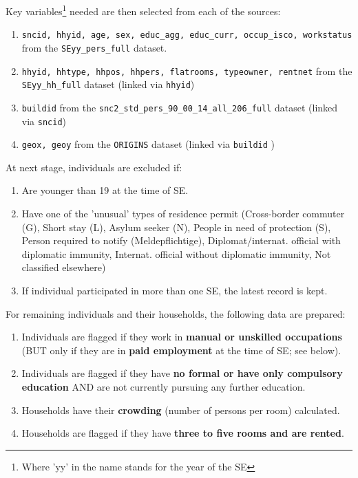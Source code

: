 \documentclass[a4paper, notitlepage, fleqn]{article} %
\begin{document}
Key variables\footnote{Where 'yy' in the name stands for the year of the SE} needed are then selected from each of the sources:
	
\begin{enumerate}

	\item \texttt{sncid, hhyid, age, sex, educ\_agg, educ\_curr, occup\_isco, workstatus} from the 
		\texttt{SEyy\_pers\_full} dataset.
		
	\item \texttt{hhyid, hhtype, hhpos, hhpers, flatrooms, typeowner, rentnet}
		from the \texttt{SEyy\_hh\_full} dataset (linked via \texttt{hhyid}) 
	
	\item \texttt{buildid}
		from the \texttt{snc2\_std\_pers\_90\_00\_14\_all\_206\_full} dataset 
		(linked via \texttt{sncid})
	
	\item \texttt{geox, geoy}
		from the \texttt{ORIGINS} dataset (linked via \texttt{buildid} 	)

\end{enumerate}

At next stage, individuals are excluded if:

\begin{enumerate}
	
	\item Are younger than 19 at the time of SE.
	
	\item Have one of the 'unusual' types of residence permit 
	(Cross-border commuter (G), Short stay (L), Asylum seeker (N), People in need of protection (S), 
	Person required to notify (Meldepflichtige), 
	Diplomat/internat. official with diplomatic immunity, 
	Internat. official without diplomatic immunity, 
	Not classified elsewhere)	
	
	\item If individual participated in more than one SE, the latest record is kept.

\end{enumerate}

For remaining individuals and their households, the following data are prepared:

\begin{enumerate}
	
	\item Individuals are flagged if they work in \textbf{manual or unskilled occupations} 
		(BUT only if they are in \textbf{paid employment} at the time of SE; see below).
	\item Individuals are flagged if they have \textbf{no formal or have only compulsory education} 
		AND are not currently pursuing any further education.
	\item Households have their \textbf{crowding} (number of persons per room) calculated.
	\item Households are flagged if they have \textbf{three to five rooms and are rented}.
	
\end{enumerate}
\end{document}
